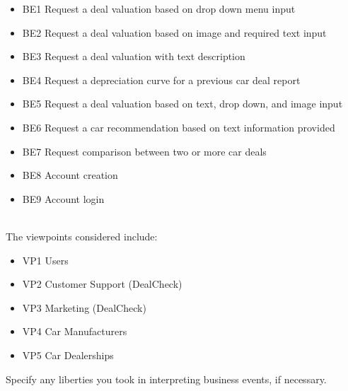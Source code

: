 \documentclass[]{article}
\begin{document}
\begin{itemize}
	\item BE1 Request a deal valuation based on drop down menu input
	\item BE2 Request a deal valuation based on image and required text input
	\item BE3 Request a deal valuation with text description
	\item BE4 Request a depreciation curve for a previous car deal report
	\item BE5 Request a deal valuation based on text, drop down, and image input
	\item BE6 Request a car recommendation based on text information provided
	\item BE7 Request comparison between two or more car deals
	\item BE8 Account creation
	\item BE9 Account login
\end{itemize}

 \\

\noindent The viewpoints considered include:

\begin{itemize}
	\item VP1 Users
	\item VP2 Customer Support (DealCheck)
	\item VP3 Marketing (DealCheck)
	\item VP4 Car Manufacturers
	\item VP5 Car Dealerships
\end{itemize}

 Specify any liberties you took in interpreting business events, if necessary. \\
\end{document}
